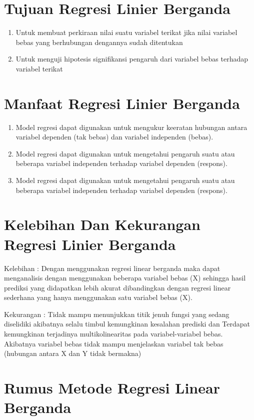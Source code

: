\section{Tujuan Regresi Linier Berganda}
\begin{enumerate}
\item Untuk membuat perkiraan nilai suatu variabel terikat jika nilai variabel bebas yang berhubungan dengannya sudah ditentukan
\item Untuk menguji hipotesis signifikansi pengaruh dari variabel bebas terhadap variabel terikat
\end{enumerate}

\section{Manfaat Regresi Linier Berganda}
\begin{enumerate}
\item Model regresi dapat digunakan untuk mengukur keeratan hubungan antara variabel dependen (tak bebas) dan variabel independen (bebas). 
\item Model regresi dapat digunakan untuk mengetahui pengaruh suatu atau beberapa variabel independen terhadap variabel dependen (respons).
\item Model regresi dapat digunakan untuk mengetahui pengaruh suatu atau beberapa variabel independen terhadap variabel dependen (respons).
\end{enumerate}

\section{Kelebihan Dan Kekurangan Regresi Linier Berganda}
\par Kelebihan : Dengan menggunakan regresi linear berganda maka dapat menganalisis dengan menggunakan beberapa variabel bebas (X) sehingga hasil prediksi yang didapatkan lebih akurat dibandingkan dengan regresi linear sederhana yang hanya menggunakan satu variabel bebas (X). 
\par Kekurangan : Tidak mampu menunjukkan titik jenuh fungsi yang sedang diselidiki akibatnya selalu timbul kemungkinan kesalahan prediski dan Terdapat kemungkinan terjadinya multikolinearitas pada variabel-variabel bebas. Akibatnya variabel bebas tidak mampu menjelaskan variabel tak bebas (hubungan antara X dan Y tidak bermakna)

\section{Rumus Metode Regresi Linear Berganda}

